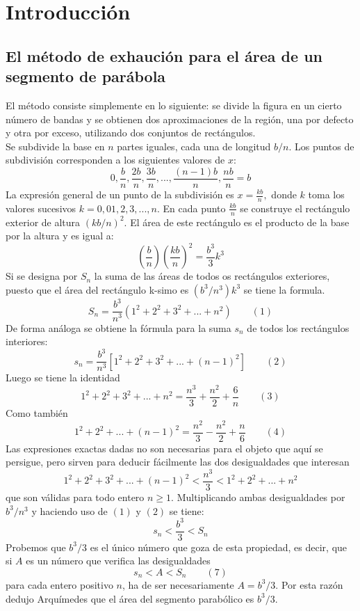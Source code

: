 \chapter*{Introducción}
\setcounter{chapter}{1}
\setcounter{section}{2}


\section{El método de exhaución para el área de un segmento de parábola}

El método consiste simplemente en lo siguiente: se divide la figura en un cierto número de bandas y se obtienen dos aproximaciones de la región, una por defecto y otra por exceso, utilizando dos conjuntos de rectángulos.\\
Se subdivide la base en $n$ partes iguales, cada una de longitud $b/n$. Los puntos de subdivisión corresponden a los siguientes valores de $x$: $$0,\dfrac{b}{n},\dfrac{2b}{n},\dfrac{3b}{n},...,\dfrac{(n-1)b}{n},\dfrac{nb}{n}=b$$
La expresión general de un punto de la subdivisión es $x=\frac{kb}{n},$ donde $k$ toma los valores sucesivos $k=0,01,2,3,...,n.$ En cada punto $\frac{kb}{n}$ se construye el rectángulo exterior de altura $(kb/n)^2$. El área de este rectángulo es el producto de la base por la altura y es igual a:
$$\left(\dfrac{b}{n}\right)\left(\dfrac{kb}{n}\right)^2=\dfrac{b^3}{3}k^3$$
Si se designa por $S_n$ la suma de las áreas de todos os rectángulos exteriores, puesto que el área del rectángulo k-simo es $(b^3/n^3)k^3$ se tiene la formula. $$S_n=\dfrac{b^3}{n^3}(1^2+2^2+3^2+...+n^2) \qquad (1)$$
De forma análoga se obtiene la fórmula para la suma $s_n$ de todos los rectángulos interiores:
$$s_n=\dfrac{b^3}{n^3}[1^2+2^2+3^2+...+(n-1)^2] \qquad (2)$$
Luego se tiene la identidad $$1^2+2^2+3^2+...+n^2=\dfrac{n^3}{3}+\dfrac{n^2}{2}+\dfrac{6}{n} \qquad (3)$$
Como también $$1^2+2^2+...+(n-1)^2=\dfrac{n^2}{3}-\dfrac{n^2}{2}+\dfrac{n}{6} \qquad (4)$$
Las expresiones exactas dadas no son necesarias para el objeto que aquí se persigue, pero sirven para deducir fácilmente las dos desigualdades que interesan $$1^2+2^2+3^2+...+(n-1)^2<\dfrac{n^3}{3}<1^2+2^2+...+n^2$$
que son válidas para todo entero $n\geq 1$. Multiplicando ambas desigualdades por $b^3/n^3$ y haciendo uso de $(1)$ y $(2)$ se tiene: $$s_n<\dfrac{b^3}{3}<S_n$$
Probemos que $b^3/3$ es el único número que goza de esta propiedad, es decir, que si $A$ es un número que verifica las desigualdades $$s_n<A<S_n \qquad (7)$$
para cada entero positivo $n$, ha de ser necesariamente $A=b^3/3$. Por esta razón dedujo Arquímedes que el área del segmento parabólico es $b^3/3$.\\
